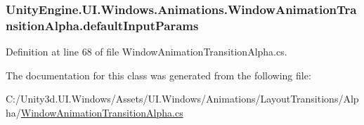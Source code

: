 \subsubsection[{default\+Input\+Params}]{ Unity\+Engine.\+U\+I.\+Windows.\+Animations.\+Window\+Animation\+Transition\+Alpha.\+default\+Input\+Params}\label{class_unity_engine_1_1_u_i_1_1_windows_1_1_animations_1_1_window_animation_transition_alpha_a049be9846c26a4adfeee5ec1b3697679}


Definition at line 68 of file Window\+Animation\+Transition\+Alpha.\+cs.



The documentation for this class was generated from the following file\+:\begin{DoxyCompactItemize}
\item 
C\+:/\+Unity3d.\+U\+I.\+Windows/\+Assets/\+U\+I.\+Windows/\+Animations/\+Layout\+Transitions/\+Alpha/\hyperlink{_window_animation_transition_alpha_8cs}{Window\+Animation\+Transition\+Alpha.\+cs}\end{DoxyCompactItemize}

